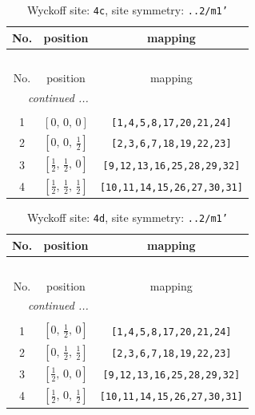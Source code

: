 \documentclass[fleqn,8pt]{jsarticle}
\begin{document}
\renewcommand{\arraystretch}{1.2}
\begin{longtable}{ccc}
\caption{Wyckoff site: {\tt 4c}, site symmetry: {\tt ..2/m1'}}
 \\
 \hline \hline
No. & position & mapping \\ \hline \endfirsthead

\multicolumn{2}{l}{\tablename\ \thetable{}} \\
 \hline \hline
No. & position & mapping \\ \hline \endhead

 \hline \hline
\multicolumn{2}{r}{\footnotesize\it continued ...} \\ \endfoot

 \hline \hline
\multicolumn{2}{r}{} \\ \endlastfoot

1 & $\left[ 0,\, 0,\, 0 \right]$ & {\tt [1,4,5,8,17,20,21,24]} \\ \hline
2 & $\left[ 0,\, 0,\, \frac{1}{2} \right]$ & {\tt [2,3,6,7,18,19,22,23]} \\ \hline
3 & $\left[ \frac{1}{2},\, \frac{1}{2},\, 0 \right]$ & {\tt [9,12,13,16,25,28,29,32]} \\ \hline
4 & $\left[ \frac{1}{2},\, \frac{1}{2},\, \frac{1}{2} \right]$ & {\tt [10,11,14,15,26,27,30,31]} \\
\end{longtable}
\renewcommand{\arraystretch}{1.2}
\begin{longtable}{ccc}
\caption{Wyckoff site: {\tt 4d}, site symmetry: {\tt ..2/m1'}}
 \\
 \hline \hline
No. & position & mapping \\ \hline \endfirsthead

\multicolumn{2}{l}{\tablename\ \thetable{}} \\
 \hline \hline
No. & position & mapping \\ \hline \endhead

 \hline \hline
\multicolumn{2}{r}{\footnotesize\it continued ...} \\ \endfoot

 \hline \hline
\multicolumn{2}{r}{} \\ \endlastfoot

1 & $\left[ 0,\, \frac{1}{2},\, 0 \right]$ & {\tt [1,4,5,8,17,20,21,24]} \\ \hline
2 & $\left[ 0,\, \frac{1}{2},\, \frac{1}{2} \right]$ & {\tt [2,3,6,7,18,19,22,23]} \\ \hline
3 & $\left[ \frac{1}{2},\, 0,\, 0 \right]$ & {\tt [9,12,13,16,25,28,29,32]} \\ \hline
4 & $\left[ \frac{1}{2},\, 0,\, \frac{1}{2} \right]$ & {\tt [10,11,14,15,26,27,30,31]} \\
\end{longtable}
\end{document}
